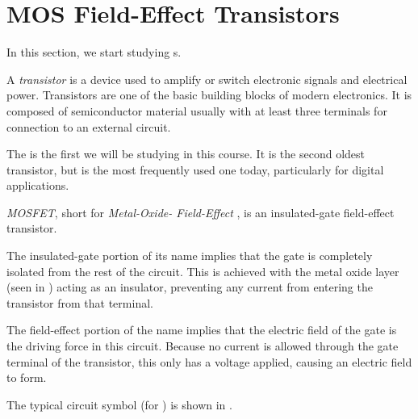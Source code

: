 \section{MOS Field-Effect Transistors}\label{sec:MOSFETs}
In this section, we start studying s.

\begin{definition}[Transistor]\label{def:Transistor}
  A \emph{transistor} is a  device used to amplify or switch electronic signals and electrical power.
  Transistors are one of the basic building blocks of modern electronics.
  It is composed of semiconductor material usually with at least three terminals for connection to an external circuit.
\end{definition}

The  is the first  we will be studying in this course.
It is the second oldest transistor, but is the most frequently used one today, particularly for digital applications.

\begin{definition}[MOSFET]\label{def:MOSFET}
  \emph{MOSFET}, short for \emph{Metal-Oxide- Field-Effect }, is an insulated-gate field-effect transistor.

  The insulated-gate portion of its name implies that the gate is completely isolated from the rest of the circuit.
  This is achieved with the metal oxide layer (seen in ) acting as an insulator, preventing any current from entering the transistor from that terminal.

  The field-effect portion of the name implies that the electric field of the gate is the driving force in this circuit.
  Because no current is allowed through the gate terminal of the transistor, this only has a voltage applied, causing an electric field to form.

  The typical circuit symbol (for ) is shown in .
\end{definition}


